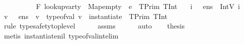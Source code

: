 \begin{isabellebody}
\ \ \ \ \ \ \ \ \ \ {\isachardoublequoteopen}F{\isacharcomma}{\kern0pt}\ {\isacharparenleft}{\kern0pt}lookup{\isacharunderscore}{\kern0pt}var{\isacharunderscore}{\kern0pt}ty\ {\isasymLambda}{\isacharcomma}{\kern0pt}\ Map{\isachardot}{\kern0pt}empty{\isacharparenright}{\kern0pt}\ {\isasymturnstile}\ e\ {\isacharcolon}{\kern0pt}\ TPrim\ TInt{\isachardoublequoteclose}\isanewline
\ \ \ {\isachardoublequoteopen}{\isasymexists}i{\isachardot}{\kern0pt}\ {\isacharparenleft}{\kern0pt}{\isasymLambda}{\isacharcomma}{\kern0pt}{\isasymGamma}{\isacharcomma}{\kern0pt}{\isacharbrackleft}{\kern0pt}{\isacharbrackright}{\kern0pt}\ {\isasymturnstile}\ {\isasymlangle}e{\isacharcomma}{\kern0pt}n{\isacharunderscore}{\kern0pt}s{\isasymrangle}\ {\isasymDown}\ {\isacharparenleft}{\kern0pt}IntV\ i{\isacharparenright}{\kern0pt}{\isacharparenright}{\kern0pt}{\isachardoublequoteclose}\isanewline
%
\isadelimproof
%
\endisadelimproof
%
\isatagproof
{}\isamarkupfalse%
\ {\isacharminus}{\kern0pt}\isanewline
\ \ \isamarkupfalse%
\ {\isachardoublequoteopen}{\isasymexists}v{\isachardot}{\kern0pt}\ {\isacharparenleft}{\kern0pt}{\isasymLambda}{\isacharcomma}{\kern0pt}{\isasymGamma}{\isacharcomma}{\kern0pt}{\isacharbrackleft}{\kern0pt}{\isacharbrackright}{\kern0pt}\ {\isasymturnstile}\ {\isasymlangle}e{\isacharcomma}{\kern0pt}n{\isacharunderscore}{\kern0pt}s{\isasymrangle}\ {\isasymDown}\ v{\isacharparenright}{\kern0pt}\ {\isasymand}\ type{\isacharunderscore}{\kern0pt}of{\isacharunderscore}{\kern0pt}val\ v\ {\isacharequal}{\kern0pt}\ instantiate\ {\isacharbrackleft}{\kern0pt}{\isacharbrackright}{\kern0pt}\ {\isacharparenleft}{\kern0pt}TPrim\ TInt{\isacharparenright}{\kern0pt}{\isachardoublequoteclose}\isanewline
\ \ \ \ \isamarkupfalse%
\ {\isacharparenleft}{\kern0pt}rule\ type{\isacharunderscore}{\kern0pt}safety{\isacharunderscore}{\kern0pt}top{\isacharunderscore}{\kern0pt}level{\isacharparenright}{\kern0pt}\isanewline
\ \ \ \ \isamarkupfalse%
\ assms\isanewline
\ \ \ \ \isamarkupfalse%
\ auto\isanewline
\ \ \isamarkupfalse%
\ {\isacharquery}{\kern0pt}thesis\isanewline
\ \ \ \ \isamarkupfalse%
\ {\isacharparenleft}{\kern0pt}metis\ instantiate{\isacharunderscore}{\kern0pt}nil\ type{\isacharunderscore}{\kern0pt}of{\isacharunderscore}{\kern0pt}val{\isacharunderscore}{\kern0pt}int{\isacharunderscore}{\kern0pt}elim{\isacharparenright}{\kern0pt}\isanewline
{}\isamarkupfalse%
%
\endisatagproof
{\isafoldproof}%
%
\isadelimproof

\end{isabellebody}
